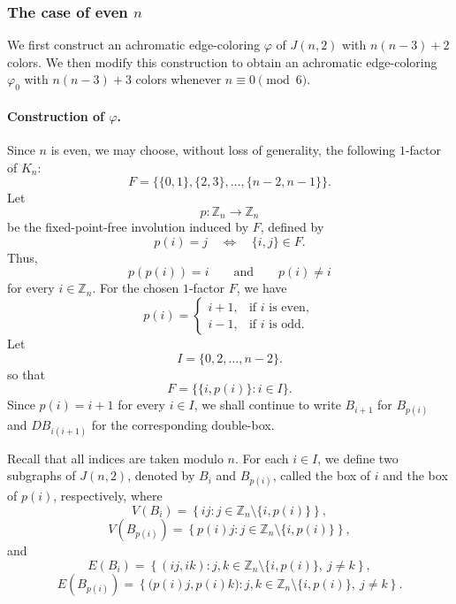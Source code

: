 \documentclass{article}
\newcommand{\blue}[1]{\textcolor{blue}{#1}}
\begin{document}
\subsubsection{The case of even $n$}
We first construct an achromatic edge-coloring $\varphi$ of $J(n,2)$ with $n(n-3)+2$ colors. We then modify this construction to obtain an achromatic edge-coloring $\varphi_0$ with $n(n-3)+3$ colors whenever
$n \equiv 0 \pmod{6}$.

\paragraph{Construction of $\varphi$.}

Since $n$ is even, we may choose, without loss of generality, the
following $1$-factor of $K_n$:
$$
F=
\bigl\{
\{0,1\},\{2,3\},\ldots,\{n-2,n-1\}
\bigr\}.
$$
Let
$$
p:\mathbb{Z}_n\longrightarrow\mathbb{Z}_n
$$
be the fixed-point-free involution induced by $F$, defined by
$$
p(i)=j
\quad\Longleftrightarrow\quad
\{i,j\}\in F.
$$
Thus,
$$
p(p(i))=i
\qquad\text{and}\qquad
p(i)\neq i
$$
for every $i\in\mathbb{Z}_n$. For the chosen $1$-factor $F$, we have
$$
p(i)=
\begin{cases}
i+1, & \text{if $i$ is even},\\
i-1, & \text{if $i$ is odd}.
\end{cases}
$$
Let
$$
I=\{0,2,\ldots,n-2\}.
$$
so that
$$
F=\bigl\{\{i,p(i)\}:i\in I\bigr\}.
$$
Since $p(i)=i+1$ for every $i\in I$, we shall continue to write
$B_{i+1}$ for $B_{p(i)}$ and $DB_{i(i+1)}$ for the corresponding
double-box.

Recall that all indices are taken modulo $n$. 
For each $i\in I$, we define two subgraphs of $J(n,2)$, denoted by
$B_i$ and $B_{p(i)}$, called the box of $i$ and the box of $p(i)$,
respectively, where
$$
V(B_i)
=
\left\{
ij:j\in\mathbb{Z}_n\setminus\{i,p(i)\}
\right\},
$$
$$
V(B_{p(i)})
=
\left\{
p(i)j:j\in\mathbb{Z}_n\setminus\{i,p(i)\}
\right\},
$$
and
$$
E(B_i)
=
\left\{
(ij,ik):
j,k\in\mathbb{Z}_n\setminus\{i,p(i)\},
\ j\neq k
\right\},
$$
$$
E(B_{p(i)})
=
\left\{
\bigl(p(i)j,p(i)k\bigr):
j,k\in\mathbb{Z}_n\setminus\{i,p(i)\},
\ j\neq k
\right\}.
$$


 
\end{document}
